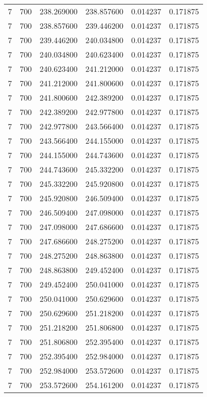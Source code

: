 \begin{longtable}{rrrrrr}
7 & 700 & 238.269000 & 238.857600 & 0.014237 & 0.171875 \\
7 & 700 & 238.857600 & 239.446200 & 0.014237 & 0.171875 \\
7 & 700 & 239.446200 & 240.034800 & 0.014237 & 0.171875 \\
7 & 700 & 240.034800 & 240.623400 & 0.014237 & 0.171875 \\
7 & 700 & 240.623400 & 241.212000 & 0.014237 & 0.171875 \\
7 & 700 & 241.212000 & 241.800600 & 0.014237 & 0.171875 \\
7 & 700 & 241.800600 & 242.389200 & 0.014237 & 0.171875 \\
7 & 700 & 242.389200 & 242.977800 & 0.014237 & 0.171875 \\
7 & 700 & 242.977800 & 243.566400 & 0.014237 & 0.171875 \\
7 & 700 & 243.566400 & 244.155000 & 0.014237 & 0.171875 \\
7 & 700 & 244.155000 & 244.743600 & 0.014237 & 0.171875 \\
7 & 700 & 244.743600 & 245.332200 & 0.014237 & 0.171875 \\
7 & 700 & 245.332200 & 245.920800 & 0.014237 & 0.171875 \\
7 & 700 & 245.920800 & 246.509400 & 0.014237 & 0.171875 \\
7 & 700 & 246.509400 & 247.098000 & 0.014237 & 0.171875 \\
7 & 700 & 247.098000 & 247.686600 & 0.014237 & 0.171875 \\
7 & 700 & 247.686600 & 248.275200 & 0.014237 & 0.171875 \\
7 & 700 & 248.275200 & 248.863800 & 0.014237 & 0.171875 \\
7 & 700 & 248.863800 & 249.452400 & 0.014237 & 0.171875 \\
7 & 700 & 249.452400 & 250.041000 & 0.014237 & 0.171875 \\
7 & 700 & 250.041000 & 250.629600 & 0.014237 & 0.171875 \\
7 & 700 & 250.629600 & 251.218200 & 0.014237 & 0.171875 \\
7 & 700 & 251.218200 & 251.806800 & 0.014237 & 0.171875 \\
7 & 700 & 251.806800 & 252.395400 & 0.014237 & 0.171875 \\
7 & 700 & 252.395400 & 252.984000 & 0.014237 & 0.171875 \\
7 & 700 & 252.984000 & 253.572600 & 0.014237 & 0.171875 \\
7 & 700 & 253.572600 & 254.161200 & 0.014237 & 0.171875 \\

\end{longtable}
